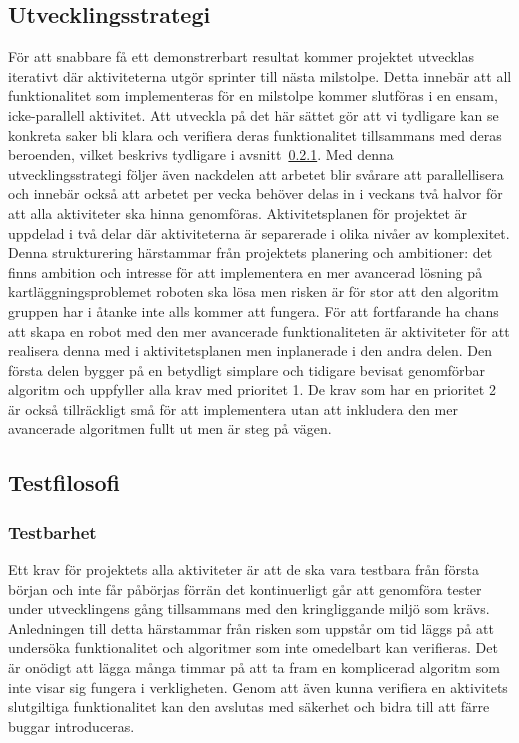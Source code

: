 \documentclass{article}
\begin{document}
\subsection{Utvecklingsstrategi}
För att snabbare få ett demonstrerbart resultat kommer projektet utvecklas iterativt där aktiviteterna utgör sprinter till nästa milstolpe. Detta innebär att all funktionalitet som implementeras för en milstolpe kommer slutföras i en ensam, icke-parallell aktivitet. Att utveckla på det här sättet gör att vi tydligare kan se konkreta saker bli klara och verifiera deras funktionalitet tillsammans med deras beroenden, vilket beskrivs tydligare i avsnitt~\ref{sec:testbarhet}. Med denna utvecklingsstrategi följer även nackdelen att arbetet blir svårare att parallellisera och innebär också att arbetet per vecka behöver delas in i veckans två halvor för att alla aktiviteter ska hinna genomföras.
\newline\newline
Aktivitetsplanen för projektet är uppdelad i två delar där aktiviteterna är separerade i olika nivåer av komplexitet. Denna strukturering härstammar från projektets planering och ambitioner: det finns ambition och intresse för att implementera en mer avancerad lösning på kartläggningsproblemet roboten ska lösa men risken är för stor att den algoritm gruppen har i åtanke inte alls kommer att fungera. För att fortfarande ha chans att skapa en robot med den mer avancerade funktionaliteten är aktiviteter för att realisera denna med i aktivitetsplanen men inplanerade i den andra delen. Den första delen bygger på en betydligt simplare och tidigare bevisat genomförbar algoritm och uppfyller alla krav med prioritet 1. De krav som har en prioritet 2 är också tillräckligt små för att implementera utan att inkludera den mer avancerade algoritmen fullt ut men är steg på vägen.

\subsection{Testfilosofi}
\subsubsection{Testbarhet}
\label{sec:testbarhet}
Ett krav för projektets alla aktiviteter är att de ska vara testbara från första början och inte får påbörjas förrän det kontinuerligt går att genomföra tester under utvecklingens gång tillsammans med den kringliggande miljö som krävs. Anledningen till detta härstammar från risken som uppstår om tid läggs på att undersöka funktionalitet och algoritmer som inte omedelbart kan verifieras. Det är onödigt att lägga många timmar på att ta fram en komplicerad algoritm som inte visar sig fungera i verkligheten. Genom att även kunna verifiera en aktivitets slutgiltiga funktionalitet kan den avslutas med säkerhet och bidra till att färre buggar introduceras.
\end{document}
